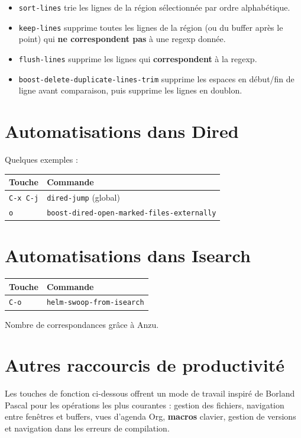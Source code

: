 \documentclass{mcreport}
\begin{document}
\begin{itemize}
\item \verb|sort-lines| trie les lignes de la région sélectionnée par ordre alphabétique.
\item \verb|keep-lines| supprime toutes les lignes de la région (ou du buffer après le
point) qui \textbf{ne correspondent pas} à une regexp donnée.
\item \verb|flush-lines| supprime les lignes qui \textbf{correspondent} à la regexp.
\item \verb|boost-delete-duplicate-lines-trim| supprime les espaces en début/fin de ligne
avant comparaison, puis supprime les lignes en doublon.
\end{itemize}
\section{Automatisations dans Dired}
\label{sec:org92995d9}

Quelques exemples :

\begin{center}
\begin{tabular}{ll}
Touche & Commande\\
\hline
\lstinline|C-x C-j| & \lstinline|dired-jump| (global)\\
\lstinline|o| & \lstinline|boost-dired-open-marked-files-externally|\\
\end{tabular}
\end{center}
\section{Automatisations dans Isearch}
\label{sec:orgbf84369}

\begin{center}
\begin{tabular}{ll}
Touche & Commande\\
\hline
\lstinline|C-o| & \lstinline|helm-swoop-from-isearch|\\
\end{tabular}
\end{center}

Nombre de correspondances grâce à Anzu.
\section{Autres raccourcis de productivité}
\label{sec:orgaba17a9}

Les touches de fonction ci-dessous offrent un mode de travail inspiré de Borland
Pascal pour les opérations les plus courantes : gestion des fichiers, navigation
entre fenêtres et buffers, vues d'agenda Org, \textbf{macros} clavier, gestion de
versions et navigation dans les erreurs de compilation.
\end{document}
